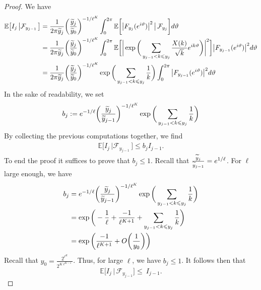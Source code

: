 \documentclass{article}
\begin{document}
\begin{proof}[Proof]
    We have
    $$
    \begin{aligned}
        \mathbb{E}\big[I_{j} \, \big| \mathcal{F}_{y_{j-1}}\,\big] & = \frac{1}{2\pi\widetilde{y}_j} \bigg(\frac{\widetilde{y}_{j}}{\widetilde{y}_{0}}\bigg)^{-1/\ell^K}\int_{0}^{2\pi } \mathbb{E}\bigg[ \big|F_{y_j}({\rm e}^{i\vartheta})\big|^2\, \big| \, \mathcal{F}_{y_j}\bigg]{\rm d}\vartheta 
        \\ & = \frac{1}{2\pi\widetilde{y}_j} \bigg(\frac{\widetilde{y}_{j}}{\widetilde{y}_{0}}\bigg)^{-1/\ell^K}\int_{0}^{2\pi } \mathbb{E}\bigg[ \bigg| \exp\bigg( \sum_{y_{j-1}<k\leqslant y_j}\frac{X(k)}{\sqrt{k}} {\rm e}^{ik\vartheta}\bigg)\bigg|^2\bigg]\big|F_{y_{j-1}}({\rm e}^{i\vartheta})\big|^2{\rm d}\vartheta 
        \\ & = \frac{1}{2\pi\widetilde{y}_j} \bigg(\frac{\widetilde{y}_{j}}{\widetilde{y}_{0}}\bigg)^{-1/\ell^K} \exp\bigg( \sum_{y_{j-1}<k\leqslant y_j}\frac{1}{k} \bigg)\int_{0}^{2\pi }  \big|F_{y_{j-1}}({\rm e}^{i\vartheta})\big|^2{\rm d}\vartheta 
    \end{aligned}
    $$
   In the sake of readability, we set
   $$
   b_j:= {\rm e}^{-1/\ell} \bigg(\frac{\widetilde{y}_{j}}{\widetilde{y}_{j-1}}\bigg)^{-1/\ell^K} \exp\bigg( \sum_{y_{j-1}<k\leqslant y_j}\frac{1}{k} \bigg) 
   $$
    By collecting the previous computations together, we find
    $$
    \begin{aligned}
        \mathbb{E}\big[I_{j} \, \big| \mathcal{F}_{y_{j-1}}\,\big] \leqslant b_jI_{j-1}.
    \end{aligned}
    $$
    To end the proof it suffices to prove that $b_j\leqslant 1$. Recall that $\frac{\widetilde{y}_j}{\widetilde{y}_{j-1}}={\rm e}^{1/\ell}$.
    For $\ell$ large enough, we have
$$
\begin{aligned}
b_j & = {\rm e}^{-1/\ell} \bigg(\frac{\widetilde{y}_{j}}{\widetilde{y}_{j-1}}\bigg)^{-1/\ell^K} \exp\bigg( \sum_{y_{j-1}<k\leqslant y_j}\frac{1}{k} \bigg) 
\\ & = \exp \bigg( -\frac{1}{\ell} + \frac{-1}{\ell^{K+1}}+\sum_{y_{j-1} <   k \leqslant y_{j}} \frac{1}{k}  \bigg) 
 \\ & = \exp \bigg(\frac{-1}{\ell^{K+1}} +O\bigg(\frac{1}{y_0}\bigg) \bigg)
\end{aligned}
$$
Recall that $y_0=\frac{2^{\ell^K}}{2^{K\ell^{K-1}}}$. Thus, for large $\ell$, we have $b_j\leqslant 1$.
It follows then that $$\mathbb{E}\big[I_{j} \, \big| \,\mathcal{F}_{y_{j-1}}\big] \leqslant ~ I_{j-1}.$$
\end{proof}
\end{document}
